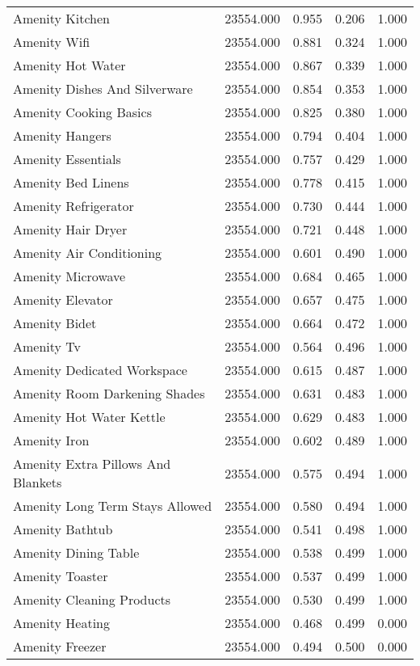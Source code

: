 \begin{tabular}{lllll}
Amenity Kitchen & 23554.000 & 0.955 & 0.206 & 1.000 \\
Amenity Wifi & 23554.000 & 0.881 & 0.324 & 1.000 \\
Amenity Hot Water & 23554.000 & 0.867 & 0.339 & 1.000 \\
Amenity Dishes And Silverware & 23554.000 & 0.854 & 0.353 & 1.000 \\
Amenity Cooking Basics & 23554.000 & 0.825 & 0.380 & 1.000 \\
Amenity Hangers & 23554.000 & 0.794 & 0.404 & 1.000 \\
Amenity Essentials & 23554.000 & 0.757 & 0.429 & 1.000 \\
Amenity Bed Linens & 23554.000 & 0.778 & 0.415 & 1.000 \\
Amenity Refrigerator & 23554.000 & 0.730 & 0.444 & 1.000 \\
Amenity Hair Dryer & 23554.000 & 0.721 & 0.448 & 1.000 \\
Amenity Air Conditioning & 23554.000 & 0.601 & 0.490 & 1.000 \\
Amenity Microwave & 23554.000 & 0.684 & 0.465 & 1.000 \\
Amenity Elevator & 23554.000 & 0.657 & 0.475 & 1.000 \\
Amenity Bidet & 23554.000 & 0.664 & 0.472 & 1.000 \\
Amenity Tv & 23554.000 & 0.564 & 0.496 & 1.000 \\
Amenity Dedicated Workspace & 23554.000 & 0.615 & 0.487 & 1.000 \\
Amenity Room Darkening Shades & 23554.000 & 0.631 & 0.483 & 1.000 \\
Amenity Hot Water Kettle & 23554.000 & 0.629 & 0.483 & 1.000 \\
Amenity Iron & 23554.000 & 0.602 & 0.489 & 1.000 \\
Amenity Extra Pillows And Blankets & 23554.000 & 0.575 & 0.494 & 1.000 \\
Amenity Long Term Stays Allowed & 23554.000 & 0.580 & 0.494 & 1.000 \\
Amenity Bathtub & 23554.000 & 0.541 & 0.498 & 1.000 \\
Amenity Dining Table & 23554.000 & 0.538 & 0.499 & 1.000 \\
Amenity Toaster & 23554.000 & 0.537 & 0.499 & 1.000 \\
Amenity Cleaning Products & 23554.000 & 0.530 & 0.499 & 1.000 \\
Amenity Heating & 23554.000 & 0.468 & 0.499 & 0.000 \\
Amenity Freezer & 23554.000 & 0.494 & 0.500 & 0.000 \\

\end{tabular}
